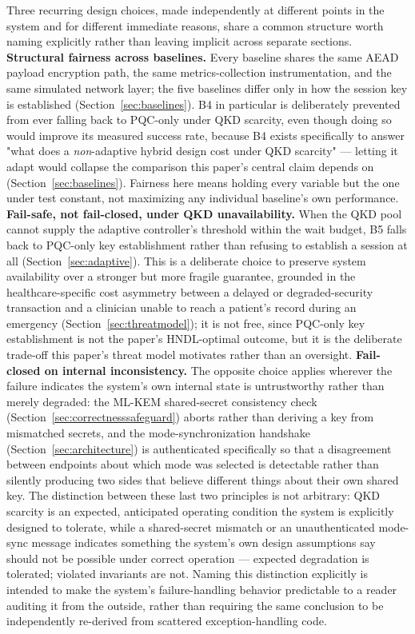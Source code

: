 \documentclass[journal]{IEEEtran}
\begin{document}
Three recurring design choices, made independently at different points in the system and for different immediate reasons, share a common structure worth naming explicitly rather than leaving implicit across separate sections. \textbf{Structural fairness across baselines.} Every baseline shares the same AEAD payload encryption path, the same metrics-collection instrumentation, and the same simulated network layer; the five baselines differ only in how the session key is established (Section~\ref{sec:baselines}). B4 in particular is deliberately prevented from ever falling back to PQC-only under QKD scarcity, even though doing so would improve its measured success rate, because B4 exists specifically to answer "what does a \emph{non}-adaptive hybrid design cost under QKD scarcity" --- letting it adapt would collapse the comparison this paper's central claim depends on (Section~\ref{sec:baselines}). Fairness here means holding every variable but the one under test constant, not maximizing any individual baseline's own performance. \textbf{Fail-safe, not fail-closed, under QKD unavailability.} When the QKD pool cannot supply the adaptive controller's threshold within the wait budget, B5 falls back to PQC-only key establishment rather than refusing to establish a session at all (Section~\ref{sec:adaptive}). This is a deliberate choice to preserve system availability over a stronger but more fragile guarantee, grounded in the healthcare-specific cost asymmetry between a delayed or degraded-security transaction and a clinician unable to reach a patient's record during an emergency (Section~\ref{sec:threatmodel}); it is not free, since PQC-only key establishment is not the paper's HNDL-optimal outcome, but it is the deliberate trade-off this paper's threat model motivates rather than an oversight. \textbf{Fail-closed on internal inconsistency.} The opposite choice applies wherever the failure indicates the system's own internal state is untrustworthy rather than merely degraded: the ML-KEM shared-secret consistency check (Section~\ref{sec:correctnesssafeguard}) aborts rather than deriving a key from mismatched secrets, and the mode-synchronization handshake (Section~\ref{sec:architecture}) is authenticated specifically so that a disagreement between endpoints about which mode was selected is detectable rather than silently producing two sides that believe different things about their own shared key. The distinction between these last two principles is not arbitrary: QKD scarcity is an expected, anticipated operating condition the system is explicitly designed to tolerate, while a shared-secret mismatch or an unauthenticated mode-sync message indicates something the system's own design assumptions say should not be possible under correct operation --- expected degradation is tolerated; violated invariants are not. Naming this distinction explicitly is intended to make the system's failure-handling behavior predictable to a reader auditing it from the outside, rather than requiring the same conclusion to be independently re-derived from scattered exception-handling code.
\end{document}
